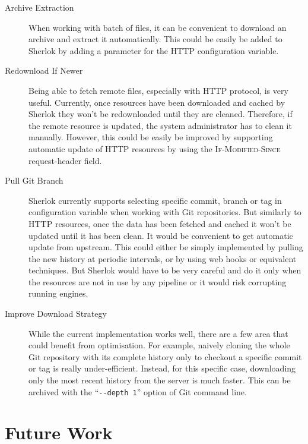 \documentclass{article}
\newcommand{\ID}[1]{{\textsc{#1}}}
\begin{document}
\begin{description}

    \item[Archive Extraction] When working with batch of files, it can be convenient to download an
        archive and extract it automatically. This could be easily be added to Sherlok by adding a
        parameter for the HTTP configuration variable.

    \item[Redownload If Newer] Being able to fetch remote files, especially with HTTP protocol, is
        very useful. Currently, once resources have been downloaded and cached by Sherlok they won't
        be redownloaded until they are cleaned. Therefore, if the remote resource is updated, the
        system administrator has to clean it manually. However, this could be easily be improved by
        supporting automatic update of HTTP resources by using the \ID{If-Modified-Since}
        request-header field.

    \item[Pull Git Branch] Sherlok currently supports selecting specific commit, branch or tag in
        configuration variable when working with Git repositories. But similarly to HTTP resources,
        once the data has been fetched and cached it won't be updated until it has been clean. It
        would be convenient to get automatic update from upstream. This could either be simply
        implemented by pulling the new history at periodic intervals, or by using web hooks or
        equivalent techniques. But Sherlok would have to be very careful and do it only when the
        resources are not in use by any pipeline or it would risk corrupting running engines.

    \item[Improve Download Strategy] While the current implementation works well, there are a few
        area that could benefit from optimisation. For example, naively cloning the whole Git
        repository with its complete history only to checkout a specific commit or tag is really
        under-efficient. Instead, for this specific case, downloading only the most recent history
        from the server is much faster. This can be archived with the ``\verb#--depth 1#'' option of
        Git command line.

\end{description}




\section{Future Work}
\end{document}
